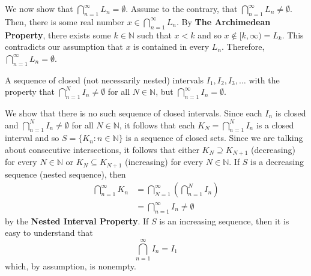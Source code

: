 \documentclass[12pt]{article}
\newcommand{\N}{\mathbb{N}}
\newenvironment{problem}[2][Problem]{\begin{trivlist}
		\item[\hskip \labelsep {\bfseries #1}\hskip \labelsep {\bfseries #2.}]}{\end{trivlist}}
\newenvironment{solution}[2][Solution]{\begin{trivlist}
		\item[\hskip \labelsep {\bfseries #1}\hskip \labelsep {\bfseries #2.}]}{\end{trivlist}}
\begin{document}
\begin{problem}{1.4.8}
\begin{enumerate}[label=(\alph*)]
\begin{solution}{(c)}
				We now show that $\bigcap_{n=1}^{\infty} L_{n} = \emptyset$. Assume to the contrary, that $\bigcap_{n=1}^{\infty} L_{n} \neq \emptyset$. Then, there is some real number $x\in \bigcap_{n=1}^{\infty} L_{n}$. By \textbf{The Archimedean Property}, there exists some $k\in \N$ such that $x<k$ and so $x\not\in [k,\infty) = L_{k}$. This contradicts our assumption that $x$ is contained in every $L_{n}$. Therefore, $\bigcap_{n=1}^{\infty} L_{n} = \emptyset$.
			\end{solution}
			\item A sequence of closed (not necessarily nested) intervals $I_{1},I_{2},I_{3},\ldots$ with the property that $\bigcap_{n=1}^{N} I_{n} \neq \emptyset$ for all $N\in \N$, but $\bigcap_{n=1}^{\infty} I_{n} = \emptyset$.
			\begin{solution}{(c)}
				We show that there is no such sequence of closed intervals. Since each $I_{n}$ is closed and $\bigcap_{n=1}^{N} I_{n} \neq \emptyset$ for all $N\in \N$, it follows that each $K_{N} = \bigcap_{n=1}^{N} I_{n}$ is a closed interval and so $S=\{K_{n}:n\in \N\}$ is a sequence of closed sets. Since we are talking about consecutive intersections, it follows that either $K_{N}\supseteq K_{N+1}$ (decreasing) for every $N\in \N$ or $K_{N}\subseteq K_{N+1}$ (increasing) for every $N\in \N$. If $S$ is a decreasing sequence (nested sequence), then  
				\begin{align*}
					\bigcap_{n=1}^{\infty} K_{n} &= \bigcap_{N=1}^{\infty} \left(\bigcap_{n=1}^{N} I_{n}\right)\\
					&= \bigcap_{n=1}^{\infty}I_{n} \neq \emptyset 
				\end{align*} 
				by the \textbf{Nested Interval Property}. If $S$ is an increasing sequence, then it is easy to understand that
				\begin{equation*}
					\bigcap_{n=1}^{\infty}I_{n} = I_{1}
				\end{equation*}
				which, by assumption, is nonempty. 
			\end{solution}
		\end{enumerate}
	\end{problem}
\end{document}
